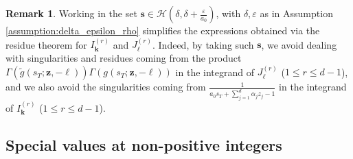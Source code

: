 \documentclass[a4paper,12pt]{article}
\theoremstyle{definition}
\newtheorem{rem}[thm]{Remark}
\numberwithin{equation}{section}
\begin{document}
\begin{rem}
Working in the set $\mathbf{s} \in \mathcal{H}(\delta,\delta+\frac{\varepsilon}{a_0})$, with $\delta, \varepsilon$ as in Assumption \ref{assumption:delta_epsilon_rho} simplifies the expressions obtained via the residue theorem for $I^{(r)}_{\mathbf{k}}$ and $J^{(r)}_{\boldsymbol{\ell}}$. Indeed, by taking such $\mathbf{s}$, we avoid dealing with singularities and residues coming from the product $\Gamma(\widetilde{g}(s_T;\mathbf{z},-\boldsymbol{\ell}))\Gamma(g(s_T;\mathbf{z},-\boldsymbol{\ell}))$ in the integrand of $J^{(r)}_{\boldsymbol{\ell}}$ ($1 \leq r \leq d-1$), and we also avoid the singularities coming from $\frac{1}{a_0s_T+\sum_{j=1}^d \alpha_j z_j -1}$ in the integrand of $I^{(r)}_{\mathbf{k}}$ ($1 \leq r \leq d-1$).
\end{rem}

\subsection{Special values at non-positive integers}
\label{subsection:values_zeta_n_general_case}
\end{document}
